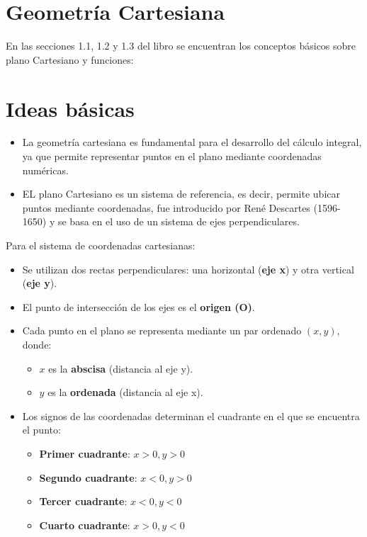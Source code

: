 \section{Geometría Cartesiana}
En las secciones 1.1, 1.2 y 1.3 del libro \cite{4} se encuentran los conceptos básicos sobre plano Cartesiano y funciones:

\section*{Ideas básicas}
\begin{itemize}
    \item La geometría cartesiana es fundamental para el desarrollo del cálculo integral, ya que permite representar puntos en el plano mediante coordenadas numéricas.
    \item EL plano Cartesiano es un sistema de referencia, es decir, permite ubicar puntos mediante coordenadas, fue introducido por René Descartes (1596-1650) y se basa en el uso de un sistema de ejes perpendiculares.
\end{itemize}

Para el sistema de coordenadas cartesianas:
\begin{itemize}
    \item Se utilizan dos rectas perpendiculares: una horizontal (\textbf{eje x}) y otra vertical (\textbf{eje y}).
    \item El punto de intersección de los ejes es el \textbf{origen (O)}.
    \item Cada punto en el plano se representa mediante un par ordenado $(x,y)$, donde:
    \begin{itemize}
        \item $x$ es la \textbf{abscisa} (distancia al eje y).
        \item $y$ es la \textbf{ordenada} (distancia al eje x).
    \end{itemize}
    \item Los signos de las coordenadas determinan el cuadrante en el que se encuentra el punto:
    \begin{itemize}
        \item \textbf{Primer cuadrante}: $x > 0, y > 0$
        \item \textbf{Segundo cuadrante}: $x < 0, y > 0$
        \item \textbf{Tercer cuadrante}: $x < 0, y < 0$
        \item \textbf{Cuarto cuadrante}: $x > 0, y < 0$
    \end{itemize}
\end{itemize}

